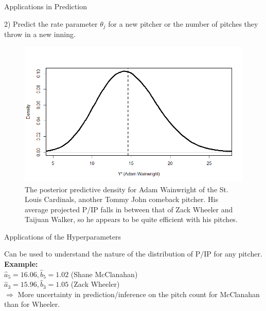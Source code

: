 \documentclass[xcolor=dvipsnames]{beamer}
\begin{document}
\begin{frame}{Applications in Prediction}

2) Predict the rate parameter $\theta_j$ for a new pitcher or the number of pitches they throw in a new inning.

\begin{figure}[h]
    \centering
    \includegraphics[scale=0.37]{figs/ww.png}
    \caption{The posterior predictive density for Adam Wainwright of the St. Louis Cardinals, another Tommy John comeback pitcher. His average projected P/IP falls in between that of Zack Wheeler and Taijuan Walker, so he appears to be quite efficient with his pitches.}
    \label{fig:ww}
\end{figure}


\end{frame}


\begin{frame}{Applications of the Hyperparameters}

Can be used to understand the nature of the distribution of P/IP for any pitcher.\\
\vspace{0.5cm}
\textbf{Example:} \\
$\hat{a}_5 = 16.06, \hat{b}_5 = 1.02$ (Shane McClanahan) \\
$\hat{a}_3 = 15.96, \hat{b}_3 = 1.05$ (Zack Wheeler) \\
\vspace{0.5cm}
$\Longrightarrow$ More uncertainty in prediction/inference on the pitch count for McClanahan than for Wheeler.


\end{frame}
\end{document}
